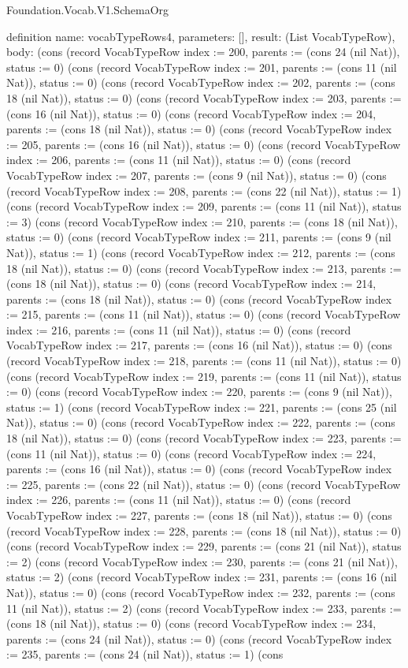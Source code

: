 \begin{lexlean}{Foundation.Vocab.V1.SchemaOrg}
\begin{semanticmodule}
definition{
  name: vocabTypeRows4,
  parameters: [],
  result: (List VocabTypeRow),
  body: (cons (record VocabTypeRow {index := 200, parents := (cons 24 (nil Nat)), status := 0}) (cons (record VocabTypeRow {index := 201, parents := (cons 11 (nil Nat)), status := 0}) (cons (record VocabTypeRow {index := 202, parents := (cons 18 (nil Nat)), status := 0}) (cons (record VocabTypeRow {index := 203, parents := (cons 16 (nil Nat)), status := 0}) (cons (record VocabTypeRow {index := 204, parents := (cons 18 (nil Nat)), status := 0}) (cons (record VocabTypeRow {index := 205, parents := (cons 16 (nil Nat)), status := 0}) (cons (record VocabTypeRow {index := 206, parents := (cons 11 (nil Nat)), status := 0}) (cons (record VocabTypeRow {index := 207, parents := (cons 9 (nil Nat)), status := 0}) (cons (record VocabTypeRow {index := 208, parents := (cons 22 (nil Nat)), status := 1}) (cons (record VocabTypeRow {index := 209, parents := (cons 11 (nil Nat)), status := 3}) (cons (record VocabTypeRow {index := 210, parents := (cons 18 (nil Nat)), status := 0}) (cons (record VocabTypeRow {index := 211, parents := (cons 9 (nil Nat)), status := 1}) (cons (record VocabTypeRow {index := 212, parents := (cons 18 (nil Nat)), status := 0}) (cons (record VocabTypeRow {index := 213, parents := (cons 18 (nil Nat)), status := 0}) (cons (record VocabTypeRow {index := 214, parents := (cons 18 (nil Nat)), status := 0}) (cons (record VocabTypeRow {index := 215, parents := (cons 11 (nil Nat)), status := 0}) (cons (record VocabTypeRow {index := 216, parents := (cons 11 (nil Nat)), status := 0}) (cons (record VocabTypeRow {index := 217, parents := (cons 16 (nil Nat)), status := 0}) (cons (record VocabTypeRow {index := 218, parents := (cons 11 (nil Nat)), status := 0}) (cons (record VocabTypeRow {index := 219, parents := (cons 11 (nil Nat)), status := 0}) (cons (record VocabTypeRow {index := 220, parents := (cons 9 (nil Nat)), status := 1}) (cons (record VocabTypeRow {index := 221, parents := (cons 25 (nil Nat)), status := 0}) (cons (record VocabTypeRow {index := 222, parents := (cons 18 (nil Nat)), status := 0}) (cons (record VocabTypeRow {index := 223, parents := (cons 11 (nil Nat)), status := 0}) (cons (record VocabTypeRow {index := 224, parents := (cons 16 (nil Nat)), status := 0}) (cons (record VocabTypeRow {index := 225, parents := (cons 22 (nil Nat)), status := 0}) (cons (record VocabTypeRow {index := 226, parents := (cons 11 (nil Nat)), status := 0}) (cons (record VocabTypeRow {index := 227, parents := (cons 18 (nil Nat)), status := 0}) (cons (record VocabTypeRow {index := 228, parents := (cons 18 (nil Nat)), status := 0}) (cons (record VocabTypeRow {index := 229, parents := (cons 21 (nil Nat)), status := 2}) (cons (record VocabTypeRow {index := 230, parents := (cons 21 (nil Nat)), status := 2}) (cons (record VocabTypeRow {index := 231, parents := (cons 16 (nil Nat)), status := 0}) (cons (record VocabTypeRow {index := 232, parents := (cons 11 (nil Nat)), status := 2}) (cons (record VocabTypeRow {index := 233, parents := (cons 18 (nil Nat)), status := 0}) (cons (record VocabTypeRow {index := 234, parents := (cons 24 (nil Nat)), status := 0}) (cons (record VocabTypeRow {index := 235, parents := (cons 24 (nil Nat)), status := 1}) (cons }
\end{semanticmodule}
\end{lexlean}
